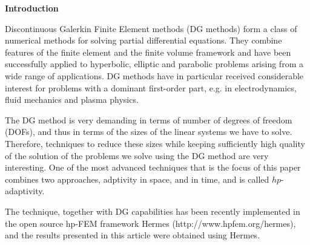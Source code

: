 
\begin{flushleft}
{\LARGE{\textbf{{Introduction}}}}
\end{flushleft}

Discontinuous Galerkin Finite Element methods (DG methods) form a class of numerical methods for solving partial differential equations. They combine features of the finite element and the finite volume framework and have been successfully applied to hyperbolic, elliptic and parabolic problems arising from a wide range of applications. DG methods have in particular received considerable interest for problems with a dominant first-order part, e.g. in electrodynamics, fluid mechanics and plasma physics.

The DG method is very demanding in terms of number of degrees of freedom (DOFs), and thus in terms of the sizes of the linear systems we have to solve. Therefore, techniques to reduce these sizes while keeping sufficiently high quality of the solution of the problems we solve using the DG method are very interesting. One of the most advanced techniques that is the focus of this paper combines two approaches, adptivity in space, and in time, and is called $hp$-adaptivity.

The technique, together with DG capabilities has been recently implemented in the open source hp-FEM framework Hermes (http://www.hpfem.org/hermes), and the results presented in this article were obtained using Hermes.
